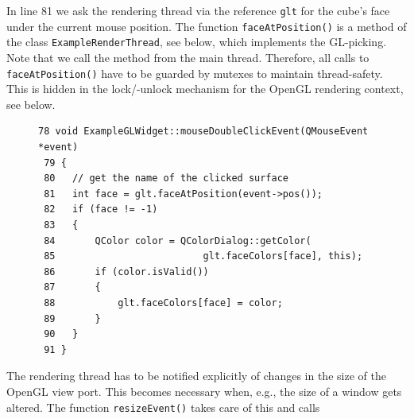 \documentclass[jou,noapacite]{apa}
\begin{document}
In line 81 we ask the rendering thread via the reference \lstinline|glt| for the
cube's face under the current mouse position.
%
The function \lstinline|faceAtPosition()| is a method of the
class \lstinline|ExampleRenderThread|, see below, which implements the
GL-picking.
%
Note that we call the method from the main thread.
%
Therefore, all calls to \lstinline|faceAtPosition()| have to be guarded by
mutexes to maintain thread-safety.
%
This is hidden in the lock/-unlock mechanism for the OpenGL rendering context,
see below.
\begin{figure}[h]
\begin{lstlisting}[basicstyle=\scriptsize]
 78 void ExampleGLWidget::mouseDoubleClickEvent(QMouseEvent *event)
 79 {
 80   // get the name of the clicked surface
 81   int face = glt.faceAtPosition(event->pos());
 82   if (face != -1)
 83   {
 84       QColor color = QColorDialog::getColor(
 85                          glt.faceColors[face], this);
 86       if (color.isValid())
 87       {
 88           glt.faceColors[face] = color;
 89       }
 90   }
 91 }
\end{lstlisting}
\end{figure}
%
%
The rendering thread has to be notified explicitly of changes in the size of
the OpenGL view port.
%
%
This becomes necessary when, e.g., the size of a window gets altered.
%
The function \lstinline|resizeEvent()| takes care of this and calls
\end{document}
